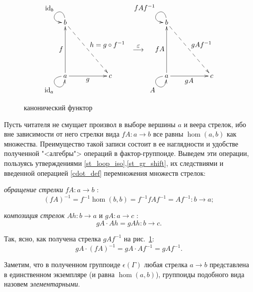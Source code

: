     \begin{figure}[h]
        \centering
        \[\xymatrix{
            b \ar@(u,l)[]_{\textstyle{\id_b}}\ar@{-->}[ddrr]^{\textstyle{h=g \circ f^{-1}}}     & &   &                                                     & b \ar@(u,l)[]_{\textstyle{fAf^{-1}}} \ar@{-->}[ddrr]^{\textstyle{g A f^{-1}}}     & &  \\
                                                                                                & &   & \stackrel{\textstyle{\epsilon}}{\longrightarrow}    &                                                                                   & &  \\
            a \ar@(l,d)[]_{\textstyle{\id_a}} \ar[uu]^{\textstyle{f}} \ar[rr]_{\textstyle{g}}   & & c &                                                     & a \ar@(l,d)[]_{\textstyle{A}} \ar[uu]^{\textstyle{fA}} \ar[rr]_{\textstyle{gA}}   & & c
        }\]
        \caption{канонический функтор}
        \label{cd_can_func}
    \end{figure}

    Пусть читателя не смущает произвол в выборе вершины $a$ и веера стрелок, ибо 
    вне зависимости от него стрелки вида $fA : a \to b$ все равны $\hom(a,b)$ как множества. 
    Преимущество такой записи состоит в ее наглядности и удобстве полученной 
    "<алгебры"> операций в фактор-группоиде. Выведем эти операции, пользуясь 
    утверждениями 
    \ref{st_loop_iso},\ref{st_gr_shift}, их следствиями и введенной операцией
    \ref{cdot_def} перемножения множеств стрелок:

    \emph{обращение стрелки} $fA : a \to b$ :
    \[(fA)^{-1} =  f^{-1} \hom(b,b) = f^{-1} fAf^{-1} = Af^{-1} : b \to a;\]

    \emph{композиция стрелок} $Ah : b \to a$ и $gA : a \to c$ :
    \[gA \cdot Ah = gAh : b \to c.\]

    Так, ясно, как получена стрелка $gAf^{-1}$ на рис.~\ref{cd_can_func}:
    \[gA \cdot (fA)^{-1} = gA \cdot Af^{-1} = gAf^{-1}.\]

    Заметим, что в полученном группоиде $\epsilon(\Gamma)$ любая стрелка 
    $a \to b$ представлена в единственном экземпляре (и равна $\hom(a,b)$), 
    группоиды подобного вида назовем \emph{элементарными}.
